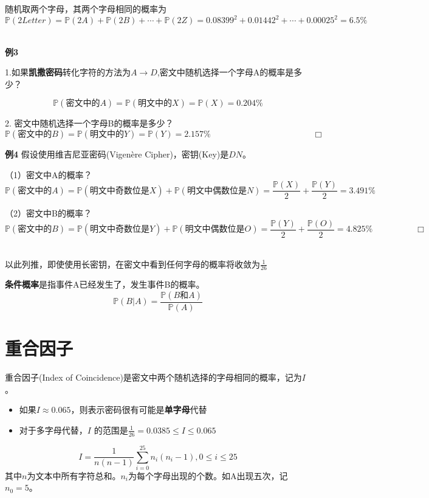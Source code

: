 \documentclass{article}
\begin{document}
随机取两个字母，其两个字母相同的概率为$\mathbb{P}(2 Letter) = \mathbb{P}(2A)+ \mathbb{P}(2B) + \cdots +\mathbb{P}(2Z)=0.08399^{2}+0.01442^{2}+ \cdots +0.00025^{2}=6.5\% $

~\\

\textbf{例3}

1.如果\textbf{凯撒密码}转化字符的方法为$A→D$,密文中随机选择一个字母A的概率是多少？

$$\mathbb{P}(\mbox{密文中的}A)  = \mathbb{P}(\mbox{明文中的}X) = \mathbb{P}(X) = 0.204\%$$

2. 密文中随机选择一个字母B的概率是多少？
$$\mathbb{P}(\mbox{密文中的}B)  = \mathbb{P}(\mbox{明文中的}Y) = \mathbb{P}(Y) = 2.157\% \quad\quad\quad\quad \quad\quad\quad\quad\quad\quad\quad\quad  \Box$$


\textbf{例4}
假设使用维吉尼亚密码(Vigenère Cipher)，密钥(Key)是$DN$。

（1）密文中A的概率？
$$\mathbb{P}(\mbox{密文中的}A)  = \mathbb{P}(\mbox{明文中奇数位是}X) + \mathbb{P}(\mbox{明文中偶数位是}N)  = \frac{\mathbb{P}(X)}{2} + \frac{\mathbb{P}(Y)}{2} = 3.491\%$$

（2）密文中B的概率？
$$\mathbb{P}(\mbox{密文中的}B)  = \mathbb{P}(\mbox{明文中奇数位是}Y) + \mathbb{P}(\mbox{明文中偶数位是}O)  = \frac{\mathbb{P}(Y)}{2} + \frac{\mathbb{P}(O)}{2} = 4.825\%\quad\quad\quad\quad\quad  \Box$$

~\\

以此列推，即使使用长密钥，在密文中看到任何字母的概率将收敛为$\frac{1}{26}$

\textbf{条件概率}是指事件A已经发生了，发生事件B的概率。
$$\mathbb{P}(B|A) = \frac{\mathbb{P}(B \mbox{和} A)}{\mathbb{P}(A)}$$

\section{重合因子}
重合因子(Index of Coincidence)是密文中两个随机选择的字母相同的概率，记为$I$。

\begin{itemize}
\item 如果$I \approx 0.065$，则表示密码很有可能是\textbf{单字母}代替
\item 对于多字母代替，$I$ 的范围是$\frac{1}{26}=0.0385 \leq I \leq 0.065$
\end{itemize}

$$I = \frac{1}{n(n-1)} \sum_{i=0}^{25}n_i(n_i-1), 0 \leq i \leq25$$
其中$n$为文本中所有字符总和。$n_i$为每个字母出现的个数。如A出现五次，记$n_0 = 5$。
\end{document}
